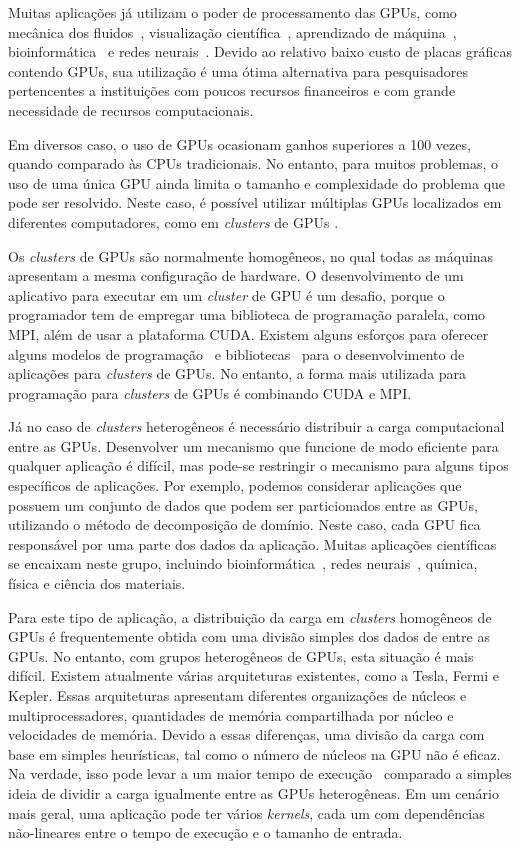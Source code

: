 Muitas aplicações já utilizam o poder de processamento das GPUs, como mecânica
dos fluidos~\cite{fluido}, visualização científica~\cite{visualizacao},
aprendizado de máquina~\cite{Aprendizado}, bioinformática~\cite{rozante} e redes
neurais~\cite{siang}. Devido ao relativo baixo custo de placas gráficas contendo
GPUs, sua utilização é uma ótima alternativa para pesquisadores pertencentes a
instituições com poucos recursos financeiros e com grande necessidade de
recursos computacionais.

Em diversos caso, o uso de GPUs ocasionam ganhos superiores a 100 vezes, quando
comparado às CPUs tradicionais. No entanto, para muitos problemas, o uso de uma
única GPU ainda limita o tamanho e complexidade do problema que pode ser
resolvido. Neste caso, é possível utilizar múltiplas GPUs localizados em
diferentes computadores, como em \emph{clusters} de GPUs \cite{raphael,
  cluster}.

Os \emph{clusters} de GPUs são normalmente homogêneos, no qual todas as
máquinas apresentam a mesma configuração de hardware. O desenvolvimento de um
aplicativo para executar em um \emph{cluster} de GPU é um desafio, porque o
programador tem de empregar uma biblioteca de programação paralela, como MPI,
além de usar a plataforma CUDA. Existem alguns esforços para oferecer alguns
modelos de programação~\cite{appCientificas, wave} e bibliotecas~\cite{snucl,
  Flat} para o desenvolvimento de aplicações para \emph{clusters} de GPUs. No
entanto, a forma mais utilizada para programação para \emph{clusters} de GPUs
é combinando CUDA e MPI.

Já no caso de \emph{clusters} heterogêneos é necessário distribuir a carga
computacional entre as GPUs. Desenvolver um mecanismo que funcione de modo
eficiente para qualquer aplicação é difícil, mas pode-se restringir o mecanismo
para alguns tipos específicos de aplicações. Por exemplo, podemos considerar
aplicações que possuem um conjunto de dados que podem ser particionados entre as
GPUs, utilizando o método de decomposição de domínio. Neste caso, cada GPU fica
responsável por uma parte dos dados da aplicação. Muitas aplicações científicas
se encaixam neste grupo, incluindo bioinformática~\cite{rozante}, redes
neurais~\cite{siang}, química, física e ciência dos materiais. 

Para este tipo de aplicação, a distribuição da carga em \emph{clusters}
homogêneos de GPUs é frequentemente obtida com uma divisão simples dos dados de
entre as GPUs. No entanto, com grupos heterogêneos de GPUs, esta situação é mais
difícil. Existem atualmente várias arquiteturas existentes, como a Tesla, Fermi
e Kepler. Essas arquiteturas apresentam diferentes organizações de núcleos e
multiprocessadores, quantidades de memória compartilhada por núcleo e
velocidades de memória. Devido a essas diferenças, uma divisão da carga com base
em simples heurísticas, tal como o número de núcleos na GPU não é eficaz. Na
verdade, isso pode levar a um maior tempo de execução~\cite{raphael} comparado a
simples ideia de dividir a carga igualmente entre as GPUs heterogêneas. Em um
cenário mais geral, uma aplicação pode ter vários \emph{kernels}, cada um com
dependências não-lineares entre o tempo de execução e o tamanho de entrada.

